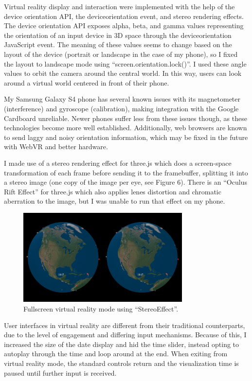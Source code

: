 \documentclass[conference]{acmsiggraph}
\begin{document}
Virtual reality display and interaction were implemented with the help of the
device orientation API, the deviceorientation event, and stereo rendering
effects. The device orientation API exposes alpha, beta, and gamma values
representing the orientation of an input device in 3D space through the
deviceorientation JavaScript event. The meaning of these values seems to change
based on the layout of the device (portrait or landscape in the case of my
phone), so I fixed the layout to landscape mode using
``screen.orientation.lock()''. I used these angle values to orbit the camera
around the central world. In this way, users can look around a virtual world
centered in front of their phone.

My Samsung Galaxy S4 phone has several known issues with its magnetometer
(interference) and gyroscope (calibration), making integration with the Google
Cardboard unreliable. Newer phones suffer less from these issues though, as
these technologies become more well established. Additionally, web browsers are
known to send laggy and noisy orientation information, which may be fixed in the
future with WebVR and better hardware.

I made use of a stereo rendering effect for three.js which does a screen-space
transformation of each frame before sending it to the framebuffer, splitting it
into a stereo image (one copy of the image per eye, see Figure 6). There is an
``Oculus Rift Effect'' for three.js which also applies lenes distortion and
chromatic aberration to the image, but I was unable to run that effect on my
phone.

\begin{figure}
  \centering
  \includegraphics[width=3.4in]{images/vr}
  \caption{Fullscreen virtual reality mode using ``StereoEffect''.}
\end{figure}

User interfaces in virtual reality are different from their traditional
counterparts, due to the level of engagement and differing input mechanisms.
Because of this, I increased the size of the date display and hid the time
slider, instead opting to autoplay through the time and loop around at the end.
When exiting from virtual reality mode, the standard controls return and the
visualization time is paused until further input is received.
\end{document}
